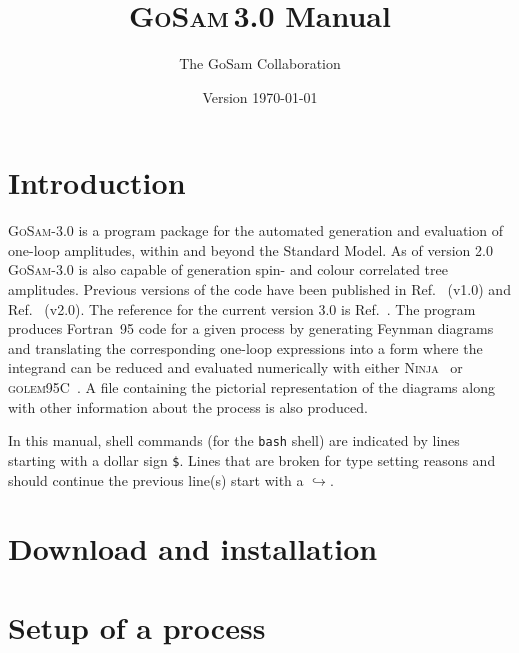 \documentclass[11pt,a4paper, oneside]{scrbook}
\title{\textsc{GoSam}\,3.0 Manual}
\author{The GoSam Collaboration}
\date{Version \today}
\newcommand{\gosamversion}{{3{.}0}}
\newcommand{\gosamv}[1][\gosamversion]{\textsc{GoSam}-#1\xspace}
\newcommand{\golemVC}{\textsc{golem95C}\xspace}
\newcommand{\fortranXC}{Fortran~95\xspace}
\newcommand{\ninja}{\textsc{Ninja}\xspace}
\newcommand{\contl}{{\ensuremath{\hookrightarrow}}}
\begin{document}
\maketitle
\tableofcontents


\chapter{Introduction}
\gosamv is a program package for the automated generation and evaluation of one-loop amplitudes, within and beyond the Standard Model. As of version 2.0 \gosamv is also capable of generation spin- and colour correlated tree amplitudes. Previous versions of the code have been published in Ref.~\cite{Cullen:2011ac} (v1.0) and Ref.~\cite{Cullen:2014yla} (v2.0). The reference for the current version 3.0 is Ref.~\cite{GoSam3}. The program produces \fortranXC code for a given process
by generating Feynman diagrams and translating
the corresponding one-loop expressions into a form where the integrand
can be reduced and evaluated numerically with either
\ninja~\cite{Mastrolia:2012bu,vanDeurzen:2013saa,Peraro:2014cba}
or \golemVC~\cite{Binoth:2008uq,Cullen:2011kv,Guillet:2013msa}.
A file containing the pictorial representation of the diagrams along with other information 
about the process is also produced. 

\vspace*{3mm}

In this manual, shell commands 
(for the \texttt{bash} shell) are indicated
by lines starting with a dollar sign \texttt{\$}.
Lines that are broken for type setting reasons and should
continue the previous line(s) start with a \contl.

\chapter{Download and installation}


\chapter{Setup of a process}
\label{chp:setup-of-a-process}

\end{document}
